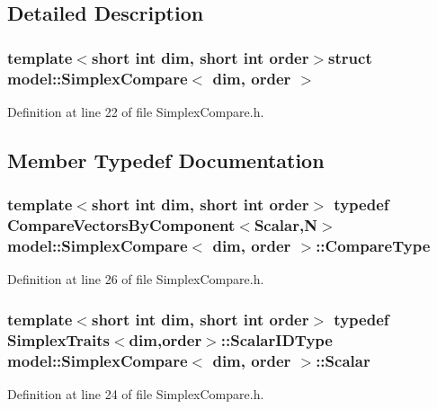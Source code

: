 \subsection{Detailed Description}
\subsubsection*{template$<$short int dim, short int order$>$struct model\+::\+Simplex\+Compare$<$ dim, order $>$}



Definition at line 22 of file Simplex\+Compare.\+h.



\subsection{Member Typedef Documentation}
\hypertarget{structmodel_1_1_simplex_compare_a685c814e5daa2b71c02c4cd9f34b0b49}{}
\subsubsection[{Compare\+Type}]{\setlength{\rightskip}{0pt plus 5cm}template$<$short int dim, short int order$>$ typedef {\bf Compare\+Vectors\+By\+Component}$<${\bf Scalar},{\bf N}$>$ {\bf model\+::\+Simplex\+Compare}$<$ {\bf dim}, order $>$\+::{\bf Compare\+Type}}\label{structmodel_1_1_simplex_compare_a685c814e5daa2b71c02c4cd9f34b0b49}


Definition at line 26 of file Simplex\+Compare.\+h.

\hypertarget{structmodel_1_1_simplex_compare_a4e031e26c2e87d24297526d4faec6c1c}{}
\subsubsection[{Scalar}]{\setlength{\rightskip}{0pt plus 5cm}template$<$short int dim, short int order$>$ typedef {\bf Simplex\+Traits}$<${\bf dim},order$>$\+::Scalar\+I\+D\+Type {\bf model\+::\+Simplex\+Compare}$<$ {\bf dim}, order $>$\+::{\bf Scalar}}\label{structmodel_1_1_simplex_compare_a4e031e26c2e87d24297526d4faec6c1c}


Definition at line 24 of file Simplex\+Compare.\+h.



